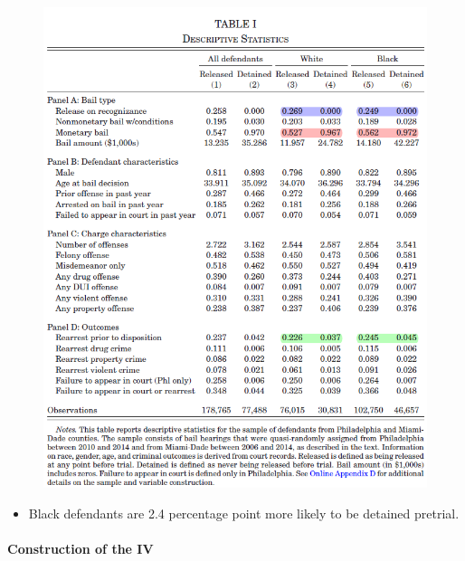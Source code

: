 \documentclass[../root]{subfiles}
\begin{document}
    \begin{figure}[h]
      \centering
      \includegraphics[scale = 1]{os0707tanji/ADY_T1}
    \end{figure}

    \begin{itemize}
      \item Black defendants are 2.4 percentage point more likely to be detained pretrial.
    \end{itemize}

    \paragraph{Construction of the IV}
\end{document}
